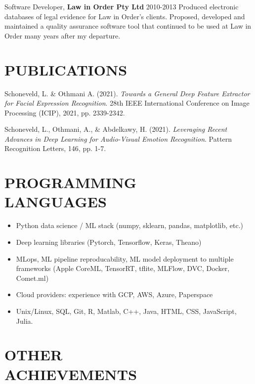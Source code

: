 \documentclass[margin]{res}
\begin{document}
\begin{resume}
		{Software Developer,} {\bf Law in Order Pty Ltd} \hfill 2010-2013\vspace{1mm}\newline
		Produced electronic databases of legal evidence for Law in Order's clients. Proposed, developed and maintained a quality assurance software tool that continued to be used at Law in Order many years after my departure.
		
		\section{PUBLICATIONS}
		
		Schoneveld, L. \& Othmani A. (2021).
		\textit{Towards a General Deep Feature Extractor for Facial Expression Recognition}. 28th IEEE International Conference on Image Processing (ICIP), 2021, pp. 2339-2342.
		
		Schoneveld, L., Othmani, A., \& Abdelkawy, H. (2021). \textit{Leveraging Recent Advances in Deep Learning for Audio-Visual Emotion Recognition}. Pattern Recognition Letters, 146, pp. 1-7.
		
		\section{PROGRAMMING\\LANGUAGES}
		\begin{itemize}
			\item Python data science / ML stack (numpy, sklearn, pandas, matplotlib, etc.)
			\item Deep learning libraries (Pytorch, Tensorflow, Keras, Theano)
			\item MLops, ML pipeline reproducability, ML model deployment to multiple frameworks (Apple CoreML, TensorRT, tflite, MLFlow, DVC, Docker, Comet.ml)
			\item Cloud providers: experience with GCP, AWS, Azure, Paperspace
			\item Unix/Linux, SQL, Git, R, Matlab, C++, Java, HTML, CSS, JavaScript, Julia.
		\end{itemize}
		
		\section{OTHER \\ ACHIEVEMENTS}
		

\end{resume}
\end{document}
